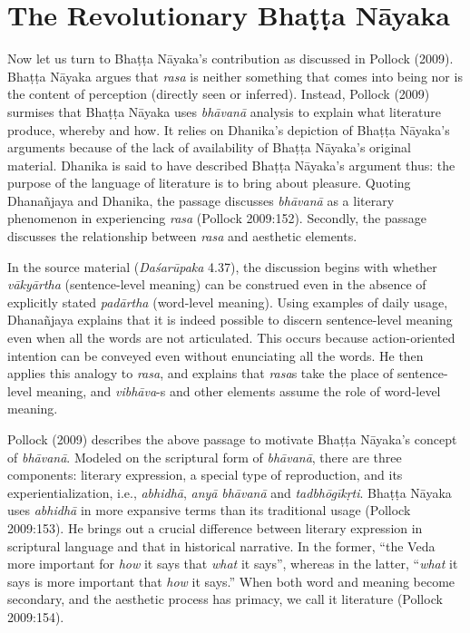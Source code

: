 \section*{The Revolutionary Bhaṭṭa Nāyaka}

Now let us turn to Bhaṭṭa Nāyaka’s contribution as discussed in Pollock (2009). Bhaṭṭa Nāyaka argues that \textsl{rasa} is neither something that comes into being nor is the content of perception (directly seen or inferred). Instead, Pollock (2009) surmises that Bhaṭṭa Nāyaka uses \textsl{bhāvanā} analysis to explain what literature produce, whereby and how. It relies on Dhanika’s depiction of Bhaṭṭa Nāyaka’s arguments because of the lack of availability of Bhaṭṭa Nāyaka’s original material. Dhanika is said to have described Bhaṭṭa Nāyaka’s argument thus: the purpose of the language of literature is to bring about pleasure. Quoting Dhanañjaya and Dhanika, the passage discusses \textsl{bhāvanā} as a literary phenomenon in experiencing \textsl{rasa} (Pollock 2009:152). Secondly, the passage discusses the relationship between \textsl{rasa} and aesthetic elements.

In the source material (\textsl{Daśarūpaka} 4.37), the discussion begins with whether \textsl{vākyārtha} (sentence-level meaning) can be construed even in the absence of explicitly stated \textsl{padārtha} (word-level meaning). Using examples of daily usage, Dhanañjaya explains that it is indeed possible to discern sentence-level meaning even when all the words are not articulated. This occurs because action-oriented intention can be conveyed even without enunciating all the words. He then applies this analogy to \textsl{rasa}, and explains that \textsl{rasa}s take the place of sentence-level meaning, and \textsl{vibhāva}-s and other elements assume the role of word-level meaning.

Pollock (2009) describes the above passage to motivate Bhaṭṭa Nāyaka’s concept of \textsl{bhāvanā}. Modeled on the scriptural form of \textsl{bhāvanā}, there are three components: literary expression, a special type of reproduction, and its experientialization, i.e., \textsl{abhidhā}, \textsl{anyā} \textsl{bhāvanā} and \textsl{tadbhōgīkṛti}. Bhaṭṭa Nāyaka uses \textsl{abhidhā} in more expansive terms than its traditional usage (Pollock 2009:153). He brings out a crucial difference between literary expression in scriptural language and that in historical narrative. In the former, “the Veda more important for \textsl{how }it says that \textsl{what }it says”, whereas in the latter, “\textsl{what} it says is more important that \textsl{how }it says.” When both word and meaning become secondary, and the aesthetic process has primacy, we call it literature (Pollock 2009:154).

